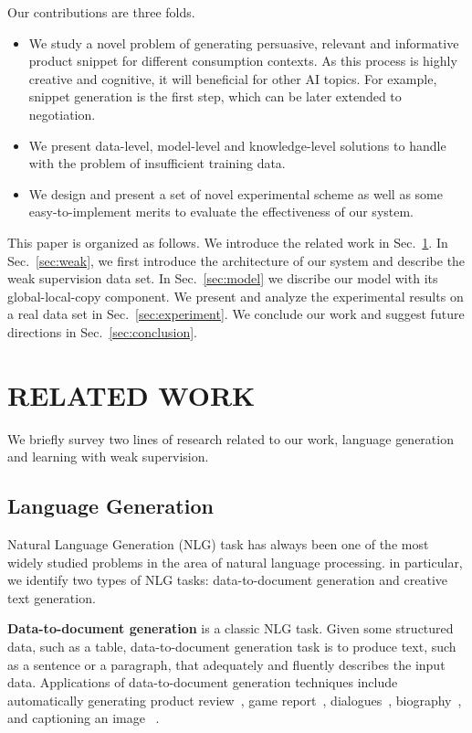\documentclass[sigconf]{acmart}
\begin{document}

Our contributions are three folds.
\begin{itemize}
\item We study a novel problem of generating persuasive, relevant and informative product snippet for different consumption contexts. As this process is highly creative and cognitive, it will beneficial for other AI topics. For example, snippet generation is the first step, which can be later extended to negotiation.
\item We present data-level, model-level and knowledge-level solutions to handle with the problem of insufficient training data.
\item We design and present a set of novel experimental scheme as well as some easy-to-implement merits to evaluate the effectiveness of our system. 
\end{itemize}


This paper is organized as follows. We introduce the related work in Sec.~\ref{sec:related}. In Sec.~\ref{sec:weak}, we first introduce the architecture of our system and describe the weak supervision data set. In Sec.~\ref{sec:model} we discribe our model with its global-local-copy component. We present and analyze the experimental results on a real data set in Sec.~\ref{sec:experiment}. We conclude our work and suggest future directions in Sec.~\ref{sec:conclusion}.

\section{RELATED WORK}\label{sec:related}
We briefly survey two lines of research related to our work, language generation and learning with weak supervision.

\subsection{Language Generation}
Natural Language Generation (NLG) task has always been one of the most widely studied problems in the area of natural language processing. in particular,  we identify two types of NLG tasks: data-to-document generation and creative text generation.

\textbf{Data-to-document generation} is a classic NLG task. Given some structured data, such as a table, data-to-document generation task is to produce text, such as a sentence or a paragraph, that adequately and fluently describes the input data. Applications of data-to-document generation techniques include automatically generating product review~\cite{dong2017learning,Costa2018Automatic}, game report~\cite{Wiseman2017Challenges}, dialogues~\cite{Yang2017Reference}, biography~\cite{Lebret2016Neural}, and captioning an image ~\cite{Karpathy2015Deep}.
\end{document}
